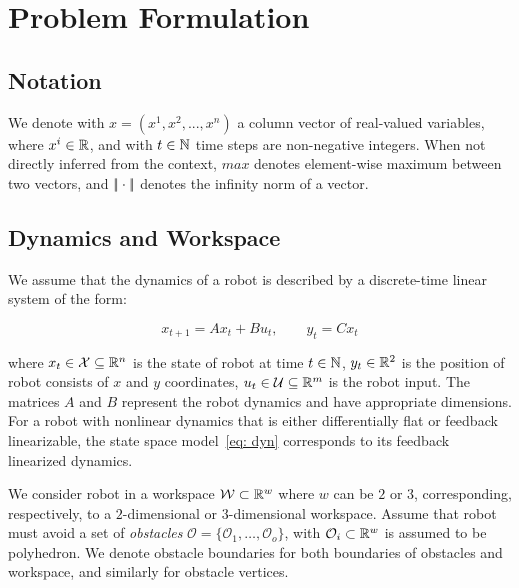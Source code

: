 \section{Problem Formulation}

\subsection{Notation}

We denote with $x = (x^1, x^2, ..., x^n)$ a column vector of real-valued variables, where $x^i \in {\mathbb{R}}$,
and with $t \in {\mathbb{N}}$ time steps are non-negative integers. 
When not directly inferred from the context, $max$ denotes element-wise maximum between two vectors, 
and $|\!|\cdot|\!|$ denotes the infinity norm of a vector.


\subsection{Dynamics and Workspace}

We assume that the dynamics of a robot is described by a discrete-time linear system of the form:

\begin{equation}
    \label{eq:dyn}    
    x_{t+1} = A x_{t} + B u_{t}, \qquad y_{t} = C x_{t} 
\end{equation}

where $x_t \in \mathcal{X} \subseteq {\mathbb{R}}^{n}$ is the state of robot at time $t \in {\mathbb{N}}$, 
$y_t \in {\mathbb{R}}^{2}$ is the position of robot consists of $x$ and $y$ coordinates,
$u_t \in \mathcal{U} \subseteq {\mathbb{R}}^{m}$ is the robot input.
The matrices $A$ and $B$ represent the robot dynamics and have appropriate dimensions. 
For a robot with nonlinear dynamics that is either differentially flat or feedback linearizable, 
the state space model~\eqref{eq: dyn} corresponds to its feedback linearized dynamics.

We consider robot in a workspace ${\mathcal{W}} \subset {\mathbb{R}}^{w}$ where $w$ can be $2$ or $3$, 
corresponding,  respectively, to a $2$-dimensional or $3$-dimensional workspace. 
Assume that robot must avoid a set of \emph{obstacles} $\mathcal{O} = \{\mathcal{O}_1, \ldots, \mathcal{O}_o\}$, 
with $\mathcal{O}_i \subset {\mathbb{R}}^w$ is assumed to be polyhedron.
We denote obstacle boundaries for both boundaries of obstacles and workspace, and similarly for obstacle vertices. 



